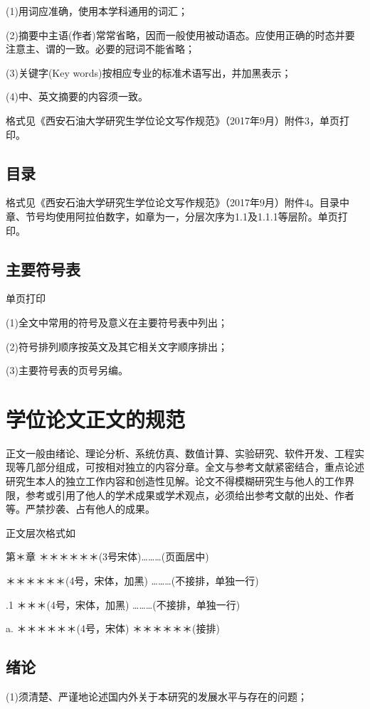 (1)用词应准确，使用本学科通用的词汇；

(2)摘要中主语(作者)常常省略，因而一般使用被动语态。应使用正确的时态并要注意主、谓的一致。必要的冠词不能省略；

(3)关键字(Key words)按相应专业的标准术语写出，并加黑表示；

(4)中、英文摘要的内容须一致。

格式见《西安石油大学研究生学位论文写作规范》（2017年9月）附件3，单页打印。

\subsection{目录}
格式见《西安石油大学研究生学位论文写作规范》（2017年9月）附件4。目录中章、节号均使用阿拉伯数字，如章为一，分层次序为1.1及1.1.1等层阶。单页打印。

\subsection{主要符号表}
单页打印

(1)全文中常用的符号及意义在主要符号表中列出；

(2)符号排列顺序按英文及其它相关文字顺序排出；

(3)主要符号表的页号另编。

\section{学位论文正文的规范}
正文一般由绪论、理论分析、系统仿真、数值计算、实验研究、软件开发、工程实现等几部分组成，可按相对独立的内容分章。全文与参考文献紧密结合，重点论述研究生本人的独立工作内容和创造性见解。论文不得模糊研究生与他人的工作界限，参考或引用了他人的学术成果或学术观点，必须给出参考文献的出处、作者等。严禁抄袭、占有他人的成果。

    正文层次格式如
\begin{center}
              第＊章  ＊＊＊＊＊＊(3号宋体)………(页面居中)
\end{center}

 ＊＊＊＊＊＊(4号，宋体，加黑) ………(不接排，单独一行)

.1 ＊＊＊(4号，宋体，加黑) ………(不接排，单独一行)

\noindent \hspace{1em}a. ＊＊＊＊＊＊(4号，宋体)  ＊＊＊＊＊＊(接排)

\subsection{绪论}
(1)须清楚、严谨地论述国内外关于本研究的发展水平与存在的问题；

